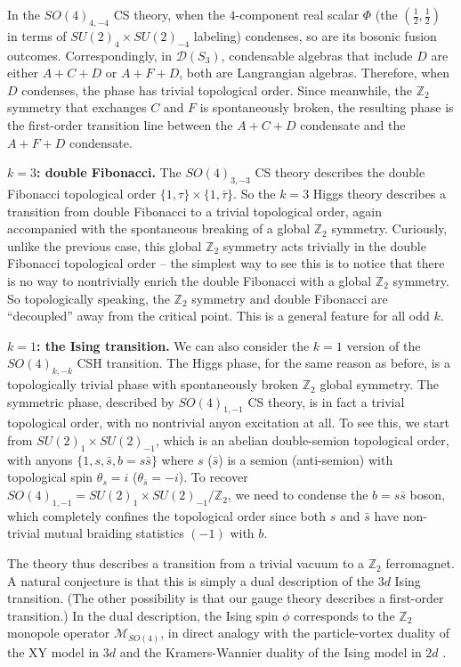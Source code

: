 \documentclass[aps, prl, superscriptaddress, twocolumn,
notitlepage, longbibliography,
floatfix]{revtex4-2}
\newcommand{\1}{\text{\uppercase\expandafter{\romannumeral1}}}
\newcommand{\2}{\text{\uppercase\expandafter{\romannumeral2}}}
\newcommand{\3}{\text{\uppercase\expandafter{\romannumeral3}}}
\newcommand{\4}{\text{\uppercase\expandafter{\romannumeral4}}}
\newcommand{\5}{\text{\uppercase\expandafter{\romannumeral5}}}
\newcommand{\6}{\text{\uppercase\expandafter{\romannumeral6}}}
\def\Z{\mathbb{Z}}
\begin{document}
In the $SO(4)_{4,-4}$ CS theory, when the $4$-component real scalar $\Phi$ (the $(\frac{1}{2},\frac{1}{2})$ in terms of $SU(2)_4\times SU(2)_{-4}$ labeling) condenses, so are its bosonic fusion outcomes. Correspondingly, in $\mathcal{D}(S_3)$, condensable algebras that include $D$ are either $A+C+D$ or $A+F+D$, both are Langrangian algebras. Therefore, when $D$ condenses, the phase has trivial topological order. Since meanwhile, the $\mathbb{Z}_2$ symmetry that exchanges $C$ and $F$ is spontaneously broken, the resulting phase is the first-order transition line between the $A+C+D$ condensate and the $A+F+D$ condensate.



\textbf{\boldmath $k=3$: double Fibonacci.} The $SO(4)_{3,-3}$ CS theory describes the double Fibonacci topological order $\{1,\tau\}\times\{1,\bar{\tau}\}$. So the $k=3$ Higgs theory describes a transition from double Fibonacci to a trivial topological order, again accompanied with the spontaneous breaking of a global $\Z_2$ symmetry. Curiously, unlike the previous case, this global $\Z_2$ symmetry acts trivially in the double Fibonacci topological order -- the simplest way to see this is to notice that there is no way to nontrivially enrich the double Fibonacci with a global $\Z_2$ symmetry. So topologically speaking, the $\Z_2$ symmetry and double Fibonacci are ``decoupled'' away from the critical point. This is a general feature for all odd $k$.

\textbf{\boldmath $k=1$: the Ising transition.} We can also consider the $k=1$ version of the $SO(4)_{k,-k}$ CSH transition. The Higgs phase, for the same reason as before, is a topologically trivial phase with spontaneously broken $\Z_2$ global symmetry. The symmetric phase, described by $SO(4)_{1,-1}$ CS theory, is in fact a trivial topological order, with no nontrivial anyon excitation at all. To see this, we start from $SU(2)_1\times SU(2)_{-1}$, which is an abelian double-semion topological order, with anyons $\{1,s,\bar{s},b=s\bar{s}\}$ where $s$ ($\bar{s}$) is a semion (anti-semion) with topological spin $\theta_s=i$ ($\theta_{\bar{s}}=-i$). To recover $SO(4)_{1,-1}=SU(2)_1\times SU(2)_{-1}/\Z_2$, we need to condense the $b=s\bar{s}$ boson, which completely confines the topological order since both $s$ and $\bar{s}$ have non-trivial mutual  braiding statistics $(-1)$ with $b$.

The theory thus describes a transition from a trivial vacuum to a $\Z_2$ ferromagnet. A natural conjecture is that this is simply a dual description of the $3d$ Ising transition. (The other possibility is that our gauge theory describes a first-order transition.) In the dual description, the Ising spin $\phi$ corresponds to the $\Z_2$ monopole operator $\mathcal{M}_{SO(4)}$, in direct analogy with the particle-vortex duality of the XY model in $3d$ and the Kramers-Wannier duality of the Ising model in $2d$ \cite{DualityReview}.
\end{document}
